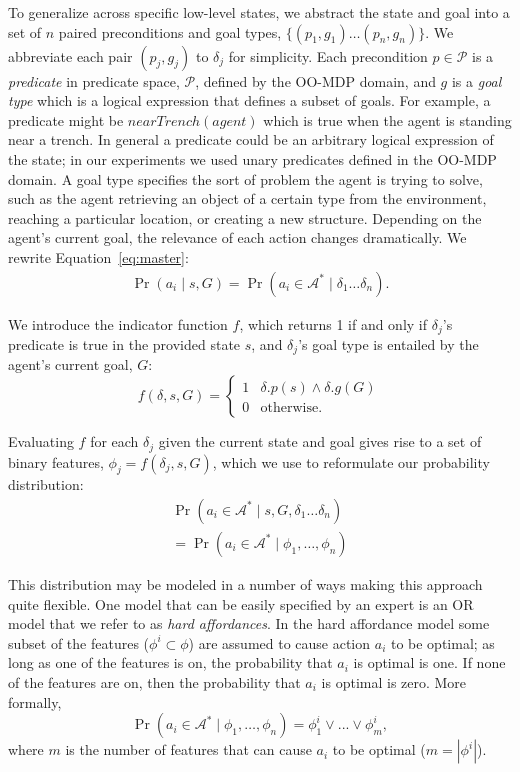 \documentclass[letterpaper]{article}
\begin{document}
To generalize across specific low-level states, we abstract the state
and goal into a set of $n$ paired preconditions and goal types, $\{
(p_1, g_1) \ldots (p_{n}, g_{n}) \}$. We abbreviate each pair $(p_j,
g_j)$ to $\delta_j$ for simplicity. Each precondition $p \in
\mathcal{P}$ is a {\it predicate} in predicate space, $\mathcal{P}$,
defined by the OO-MDP domain, and $g$ is a {\it goal type} which is a
logical expression that defines a subset of goals. For example, a
predicate might be $nearTrench(agent)$ which is true when the agent is
standing near a trench.  In general a predicate could be an arbitrary
logical expression of the state; in our experiments we used unary
predicates defined in the OO-MDP domain.  A goal type specifies the
sort of problem the agent is trying to solve, such as the agent
retrieving an object of a certain type from the environment, reaching
a particular location, or creating a new structure.  Depending on the
agent's current goal, the relevance of each action changes
dramatically.  We rewrite Equation~\ref{eq:master}:
\begin{multline}
\Pr(a_i \mid s, G)
= \Pr(a_i \in \mathcal{A}^* \mid \delta_1 \ldots \delta_n).
\end{multline}

We introduce the indicator function $f$, which returns 1 if and only if $\delta_j$'s predicate is true in the provided state $s$, and $\delta_j$'s goal type is entailed by the agent's current goal, $G$:
\begin{equation}
f(\delta, s, G) = 
\begin{cases}
1& \delta.p(s) \wedge \delta.g(G) \\
0& \text{otherwise.}
\end{cases}
\label{eq:f_func_def}
\end{equation}

Evaluating $f$ for each $\delta_j$ given the current state and goal gives rise to a set of binary features,
$\phi_j = f(\delta_j, s, G)$, which we use to reformulate our probability distribution:
\begin{multline}
\Pr(a_i \in \mathcal{A}^*  \mid s, G, \delta_1 \ldots \delta_n) \\
= \Pr(a_i \in \mathcal{A}^*  \mid \phi_1, \ldots, \phi_n)
\label{eq:feature_rep}
\end{multline}


This distribution may be modeled in a number of ways making this
approach quite flexible. One model that can be easily specified by
an expert is an OR model that we refer to as {\em hard affordances}.
In the hard affordance model some subset of the features 
($\phi^i \subset \phi$) are
assumed to cause action $a_i$ to be optimal; as long as one of
the features is on, the probability that $a_i$ is optimal is one.
If none of the features are on, then the probability that $a_i$ is 
optimal is zero. More formally,
\begin{equation}
\Pr(a_i \in \mathcal{A}^*  \mid \phi_1, \ldots, \phi_n) = \phi_1^i \lor ... \lor \phi_m^i,
\end{equation}
where $m$ is the number of features that can cause $a_i$ to be optimal ($m = |\phi^i|$).
\end{document}
